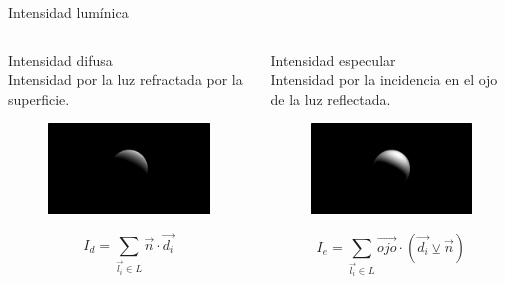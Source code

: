 \begin{frame}{Intensidad lumínica}
\begin{columns}[onlytextwidth]
        \begin{column}{0.30\textwidth}
            {\Large Intensidad difusa}\\
            Intensidad por la luz refractada por la superficie.
            \vfill
            \begin{figure}[H]
              \centering
              \includegraphics[width=1.0\textwidth]{imagenes/lightmodel/difusa.png}
            \end{figure}
            \vfill
            \[I_d = \sum_{\Vec{l_i}\in L} \Vec{n}\cdot\Vec{d_i}\]
        \end{column}
        
        \begin{column}{0.30\textwidth}
            {\Large Intensidad especular}\\
            Intensidad por la incidencia en el ojo de la luz reflectada.
            \vfill
            \begin{figure}[H]
              \centering
              \includegraphics[width=1.0\textwidth]{imagenes/lightmodel/especular-0.png}
            \end{figure}
            \vfill
            \[I_e = \sum_{\Vec{l_i}\in L} \Vec{ojo}\cdot\left(\Vec{d_i} \veebar \Vec{n}\right)\]
        \end{column}
        
    \end{columns}
    
\end{frame}


